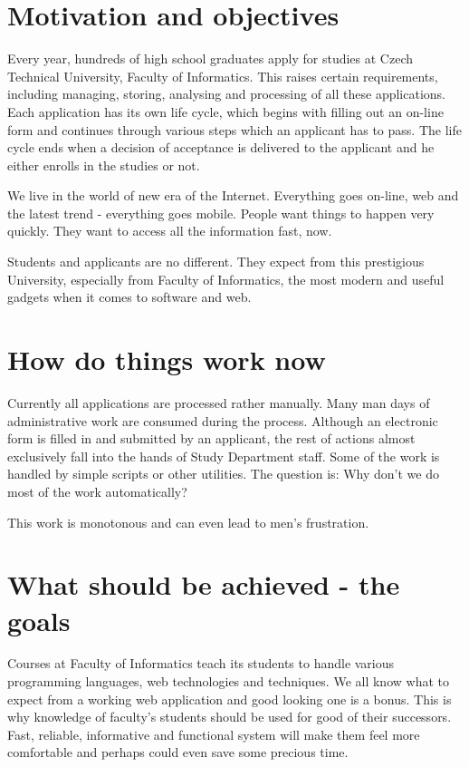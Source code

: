 \begin{introduction}
	\section{Motivation and objectives}

	Every year, hundreds of high school graduates apply for studies at Czech Technical University, Faculty of Informatics.
	This raises certain requirements, including managing, storing, analysing and processing of all these applications.
	Each application has its own life cycle, which begins with filling out an on-line form and continues through various
	steps which an applicant has to pass. The life cycle ends when a decision of acceptance is delivered to the applicant
	and he either enrolls in the studies or not.
	
	We live in the world of new era of the Internet. Everything goes on-line, web and the latest trend - everything goes
	mobile. People want things to happen very quickly. They want to access all the information fast, now.
	
	Students and applicants are no different. They expect from this prestigious University, especially from Faculty of
	Informatics, the most modern and useful gadgets when it comes to software and web.
	
	\section{How do things work now}
	
	Currently all applications are processed rather manually. Many man days of administrative work are consumed during the
	process. Although an electronic form is filled in and submitted by an applicant, the rest of actions almost exclusively
	fall into the hands of Study Department staff. Some of the work is handled by simple scripts or other utilities. The
	question is: Why don't we do most of the work automatically?
	
	This work is monotonous and can even lead to men's frustration.
	
	\section{What should be achieved - the goals}
	
	Courses at Faculty of Informatics teach its students to handle various programming languages, web technologies and
	techniques.
	We all know what to expect from a working web application and good looking one is a bonus. This is why knowledge of
	faculty's students should be used for good of their successors. Fast, reliable, informative and functional system will
	make them feel more comfortable and perhaps could even save some precious time.
	

\end{introduction}
